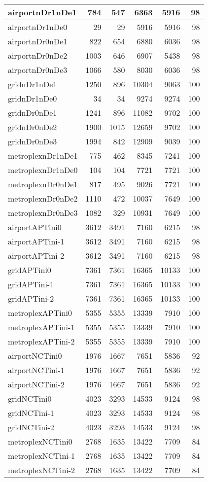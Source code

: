 \documentclass[../../../thesis.tex]{subfiles}
\begin{document}
\begin{longtable}{|l|r|r|r|r|r|}
\endlastfoot
airportnDr1nDe1 & 784 & 547 & 6363 & 5916 & 98 \\ \hline
airportnDr1nDe0 & 29 & 29 & 5916 & 5916 & 98 \\ \hline
airportnDr0nDe1 & 822 & 654 & 6880 & 6036 & 98 \\ \hline
airportnDr0nDe2 & 1003 & 646 & 6907 & 5438 & 98 \\ \hline
airportnDr0nDe3 & 1066 & 580 & 8030 & 6036 & 98 \\ \hline
gridnDr1nDe1 & 1250 & 896 & 10304 & 9063 & 100 \\ \hline
gridnDr1nDe0 & 34 & 34 & 9274 & 9274 & 100 \\ \hline
gridnDr0nDe1 & 1241 & 896 & 11082 & 9702 & 100 \\ \hline
gridnDr0nDe2 & 1900 & 1015 & 12659 & 9702 & 100 \\ \hline
gridnDr0nDe3 & 1994 & 842 & 12909 & 9039 & 100 \\ \hline
metroplexnDr1nDe1 & 775 & 462 & 8345 & 7241 & 100 \\ \hline
metroplexnDr1nDe0 & 104 & 104 & 7721 & 7721 & 100 \\ \hline
metroplexnDr0nDe1 & 817 & 495 & 9026 & 7721 & 100 \\ \hline
metroplexnDr0nDe2 & 1110 & 472 & 10037 & 7649 & 100 \\ \hline
metroplexnDr0nDe3 & 1082 & 329 & 10931 & 7649 & 100 \\ \hline
airportAPTini0 & 3612 & 3491 & 7160 & 6215 & 98 \\ \hline
airportAPTini-1 & 3612 & 3491 & 7160 & 6215 & 98 \\ \hline
airportAPTini-2 & 3612 & 3491 & 7160 & 6215 & 98 \\ \hline
gridAPTini0 & 7361 & 7361 & 16365 & 10133 & 100 \\ \hline
gridAPTini-1 & 7361 & 7361 & 16365 & 10133 & 100 \\ \hline
gridAPTini-2 & 7361 & 7361 & 16365 & 10133 & 100 \\ \hline
metroplexAPTini0 & 5355 & 5355 & 13339 & 7910 & 100 \\ \hline
metroplexAPTini-1 & 5355 & 5355 & 13339 & 7910 & 100 \\ \hline
metroplexAPTini-2 & 5355 & 5355 & 13339 & 7910 & 100 \\ \hline
airportNCTini0 & 1976 & 1667 & 7651 & 5836 & 92 \\ \hline
airportNCTini-1 & 1976 & 1667 & 7651 & 5836 & 92 \\ \hline
airportNCTini-2 & 1976 & 1667 & 7651 & 5836 & 92 \\ \hline
gridNCTini0 & 4023 & 3293 & 14533 & 9124 & 98 \\ \hline
gridNCTini-1 & 4023 & 3293 & 14533 & 9124 & 98 \\ \hline
gridNCTini-2 & 4023 & 3293 & 14533 & 9124 & 98 \\ \hline
metroplexNCTini0 & 2768 & 1635 & 13422 & 7709 & 84 \\ \hline
metroplexNCTini-1 & 2768 & 1635 & 13422 & 7709 & 84 \\ \hline
metroplexNCTini-2 & 2768 & 1635 & 13422 & 7709 & 84 \\ \hline
\end{longtable}
\end{document}
